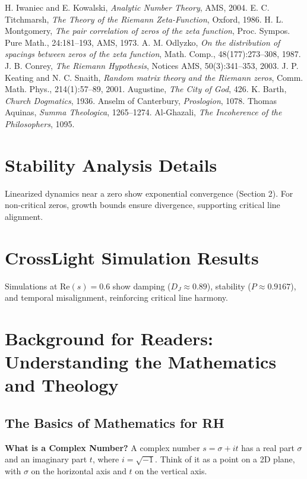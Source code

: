 \documentclass[12pt]{article}
\begin{document}
{{{\begin{thebibliography}{9}
 H. Iwaniec and E. Kowalski, \textit{Analytic Number Theory}, AMS, 2004.
 E. C. Titchmarsh, \textit{The Theory of the Riemann Zeta-Function}, Oxford, 1986.
 H. L. Montgomery, \textit{The pair correlation of zeros of the zeta function}, Proc. Sympos. Pure Math., 24:181--193, AMS, 1973.
 A. M. Odlyzko, \textit{On the distribution of spacings between zeros of the zeta function}, Math. Comp., 48(177):273--308, 1987.
 J. B. Conrey, \textit{The Riemann Hypothesis}, Notices AMS, 50(3):341--353, 2003.
 J. P. Keating and N. C. Snaith, \textit{Random matrix theory and the Riemann zeros}, Comm. Math. Phys., 214(1):57--89, 2001.
 Augustine, \textit{The City of God}, 426.
 K. Barth, \textit{Church Dogmatics}, 1936.
 Anselm of Canterbury, \textit{Proslogion}, 1078.
 Thomas Aquinas, \textit{Summa Theologica}, 1265--1274.
 Al-Ghazali, \textit{The Incoherence of the Philosophers}, 1095.
\end{thebibliography}

\appendix
\section{Stability Analysis Details}
Linearized dynamics near a zero show exponential convergence (Section 2). For non-critical zeros, growth bounds ensure divergence, supporting critical line alignment.

\section{CrossLight Simulation Results}
Simulations at \(\text{Re}(s) = 0.6\) show damping (\( D_J \approx 0.89 \)), stability (\( P \approx 0.9167 \)), and temporal misalignment, reinforcing critical line harmony.

\section{Background for Readers: Understanding the Mathematics and Theology}

\subsection{The Basics of Mathematics for RH}
\textbf{What is a Complex Number?} A complex number \( s = \sigma + it \) has a real part \(\sigma\) and an imaginary part \( t \), where \( i = \sqrt{-1} \). Think of it as a point on a 2D plane, with \(\sigma\) on the horizontal axis and \( t \) on the vertical axis.

}}}
\end{document}
